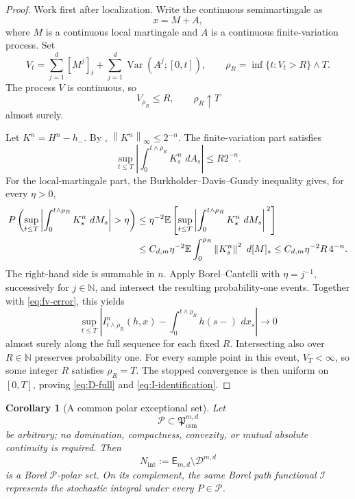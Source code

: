 \documentclass[11pt,reqno]{amsart}
\theoremstyle{plain}
\newtheorem{corollary}[corollary]{Corollary}
\theoremstyle{definition}
\newcommand{\N}{\mathbb N}
\newcommand{\E}{\mathbb E}
\newcommand{\cD}{\mathcal D}
\newcommand{\cI}{\mathcal I}
\newcommand{\cP}{\mathcal P}
\newcommand{\dd}{\,d}
\newcommand{\Var}{\operatorname{Var}}
\newcommand{\norm}[1]{\left\lVert #1\right\rVert}
\newcommand{\abs}[1]{\left\lvert #1\right\rvert}
\begin{document}
\begin{proof}
Work first after localization.  Write the continuous semimartingale as
\[
  x=M+A,
\]
where \(M\) is a continuous local martingale and \(A\) is a continuous
finite-variation process.  Set
\[
  V_t
  =
  \sum_{j=1}^d[M^j]_t
  +
  \sum_{j=1}^d\Var(A^j;[0,t]),
  \qquad
  \rho_R
  =
  \inf\{t:V_t>R\}\wedge T .
\]
The process \(V\) is continuous, so
\[
  V_{\rho_R}\le R,
  \qquad
  \rho_R\uparrow T
\]
almost surely.

Let \(K^n=H^n-h_-\).  By ,
\(\norm{K^n}_\infty\le2^{-n}\).  The finite-variation part satisfies
\begin{equation}\label{eq:fv-error}
  \sup_{t\le T}
  \abs{
    \int_0^{t\wedge\rho_R}K_s^n\,\dd A_s
  }
  \le R2^{-n}.
\end{equation}
For the local-martingale part, the Burkholder--Davis--Gundy inequality gives,
for every \(\eta>0\),
\begin{align}
  P\left(
    \sup_{t\le T}
    \abs{\int_0^{t\wedge\rho_R}K_s^n\,\dd M_s}>\eta
  \right)
  &\le
  \eta^{-2}
  \E\left[
    \sup_{t\le T}
    \abs{\int_0^{t\wedge\rho_R}K_s^n\,\dd M_s}^{\,2}
  \right] \notag\\
  &\le
  C_{d,m}\eta^{-2}
  \E\int_0^{\rho_R}\norm{K_s^n}^2\,\dd[M]_s
  \le C_{d,m}\eta^{-2}R\,4^{-n}.
  \label{eq:martingale-error}
\end{align}
The right-hand side is summable in \(n\).  Apply Borel--Cantelli with
\(\eta=j^{-1}\), successively for \(j\in\N\), and intersect the resulting
probability-one events.  Together with \eqref{eq:fv-error}, this yields
\[
  \sup_{t\le T}
  \abs{
    I_{t\wedge\rho_R}^n(h,x)
    -
    \int_0^{t\wedge\rho_R}h(s-)\,\dd x_s
  }
  \longrightarrow0
\]
almost surely along the full sequence for each fixed \(R\).  Intersecting
also over \(R\in\N\) preserves probability one.  For every sample point in
this event, \(V_T<\infty\), so some integer \(R\) satisfies
\(\rho_R=T\).  The stopped convergence is then uniform on \([0,T]\), proving
\eqref{eq:D-full} and \eqref{eq:I-identification}.
\end{proof}

\begin{corollary}[A common polar exceptional set]\label{cor:fixed-polar-integral}
Let
\[
  \cP\subset\mathfrak P_{\mathrm{csm}}^{m,d}
\]
be arbitrary; no domination, compactness, convexity, or mutual absolute
continuity is required.  Then
\[
  N_{\mathrm{int}}
  :=
  \mathsf E_{m,d}\setminus\cD^{m,d}
\]
is a Borel \(\cP\)-polar set.  On its complement, the same Borel path
functional \(\cI\) represents the stochastic integral under every
\(P\in\cP\).
\end{corollary}
\end{document}

